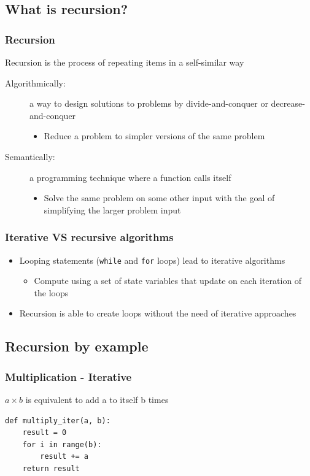 \documentclass[11pt]{beamer}
\begin{document}
\subsection{What is recursion?}
\begin{frame}\frametitle{Recursion}
\begin{block}{}
Recursion is the process of repeating items in a self-similar way
\end{block}
\begin{description}
\item[Algorithmically:] a way to design solutions to problems by divide-and-conquer or decrease-and-conquer
\begin{itemize}
\item Reduce a problem to simpler versions of the same problem
\end{itemize}
\item[Semantically:] a programming technique where a function calls itself
\begin{itemize}
\item Solve the same problem on some other input with the goal of simplifying the larger problem input
\end{itemize}
\end{description}
\end{frame}

\begin{frame}\frametitle{Iterative VS recursive algorithms}
\begin{itemize}
\item Looping statements (\texttt{while} and \texttt{for} loops) lead to iterative algorithms
\begin{itemize}
\item Compute using a set of state variables that update on each iteration of the loops
\end{itemize}
\item Recursion is able to create loops without the need of iterative approaches
\end{itemize}
\end{frame}

\subsection{Recursion by example}

\begin{frame}[fragile]\frametitle{Multiplication - Iterative}
\begin{block}{}
\centering $a \times b$ is equivalent to add a to itself b times
\end{block}
\begin{lstlisting}
def multiply_iter(a, b):
	result = 0
	for i in range(b):
		result += a
	return result
\end{lstlisting}
\end{frame}
\end{document}
